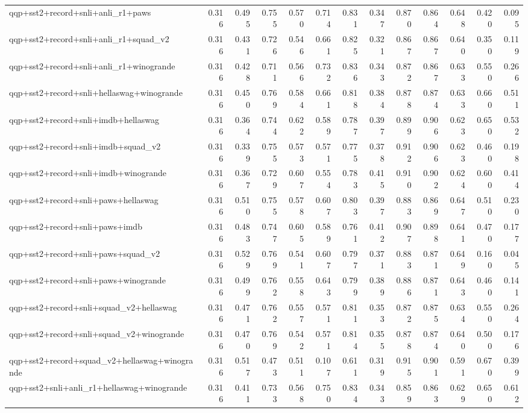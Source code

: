 \begin{table}[t]
\begin{tabular}{lrrrrrrrrrrrr}
    qqp+sst2+record+snli+anli\_r1+paws & 0.316 & 0.495 & 0.755 & 0.570 & 0.714 & 0.831 & 0.347 & 0.870 & 0.864 & 0.648 & 0.420 & 0.095 \\
    qqp+sst2+record+snli+anli\_r1+squad\_v2 & 0.316 & 0.431 & 0.726 & 0.546 & 0.661 & 0.825 & 0.321 & 0.867 & 0.867 & 0.640 & 0.350 & 0.119 \\
    qqp+sst2+record+snli+anli\_r1+winogrande & 0.316 & 0.428 & 0.711 & 0.566 & 0.732 & 0.836 & 0.343 & 0.872 & 0.867 & 0.633 & 0.550 & 0.266 \\
    qqp+sst2+record+snli+hellaswag+winogrande & 0.316 & 0.450 & 0.769 & 0.584 & 0.661 & 0.818 & 0.384 & 0.878 & 0.874 & 0.633 & 0.660 & 0.511 \\
    qqp+sst2+record+snli+imdb+hellaswag & 0.316 & 0.364 & 0.744 & 0.622 & 0.589 & 0.787 & 0.397 & 0.899 & 0.906 & 0.623 & 0.650 & 0.532 \\
    qqp+sst2+record+snli+imdb+squad\_v2 & 0.316 & 0.339 & 0.755 & 0.573 & 0.571 & 0.775 & 0.378 & 0.912 & 0.906 & 0.623 & 0.460 & 0.198 \\
    qqp+sst2+record+snli+imdb+winogrande & 0.316 & 0.367 & 0.729 & 0.607 & 0.554 & 0.783 & 0.415 & 0.910 & 0.902 & 0.624 & 0.600 & 0.414 \\
    qqp+sst2+record+snli+paws+hellaswag & 0.316 & 0.510 & 0.755 & 0.578 & 0.607 & 0.803 & 0.397 & 0.883 & 0.869 & 0.647 & 0.510 & 0.230 \\
    qqp+sst2+record+snli+paws+imdb & 0.316 & 0.483 & 0.747 & 0.605 & 0.589 & 0.761 & 0.412 & 0.907 & 0.898 & 0.641 & 0.470 & 0.177 \\
    qqp+sst2+record+snli+paws+squad\_v2 & 0.316 & 0.529 & 0.769 & 0.541 & 0.607 & 0.797 & 0.371 & 0.883 & 0.871 & 0.649 & 0.160 & 0.045 \\
    qqp+sst2+record+snli+paws+winogrande & 0.316 & 0.499 & 0.762 & 0.558 & 0.643 & 0.799 & 0.389 & 0.886 & 0.871 & 0.643 & 0.460 & 0.141 \\
    qqp+sst2+record+snli+squad\_v2+hellaswag & 0.316 & 0.471 & 0.762 & 0.557 & 0.571 & 0.811 & 0.353 & 0.872 & 0.875 & 0.634 & 0.550 & 0.264 \\
    qqp+sst2+record+snli+squad\_v2+winogrande & 0.316 & 0.470 & 0.769 & 0.542 & 0.571 & 0.814 & 0.355 & 0.878 & 0.874 & 0.640 & 0.500 & 0.176 \\
    qqp+sst2+record+squad\_v2+hellaswag+winogrande & 0.316 & 0.517 & 0.473 & 0.511 & 0.107 & 0.611 & 0.319 & 0.915 & 0.901 & 0.591 & 0.670 & 0.399 \\
    qqp+sst2+snli+anli\_r1+hellaswag+winogrande & 0.316 & 0.411 & 0.733 & 0.568 & 0.750 & 0.834 & 0.343 & 0.859 & 0.863 & 0.629 & 0.650 & 0.612 \\

\end{tabular}
\end{table}
